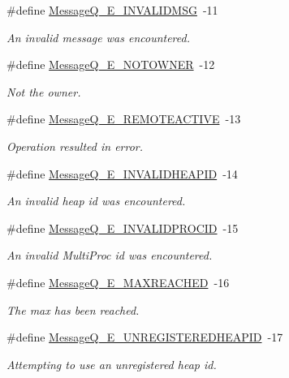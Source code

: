 \begin{DoxyCompactItemize}
\#define \hyperlink{_message_q_8h_abb81e5b9fa7bd062de50e485cd812455}{Message\-Q\-\_\-\-E\-\_\-\-I\-N\-V\-A\-L\-I\-D\-M\-S\-G}~-\/11
\begin{DoxyCompactList}\small\item\em An invalid message was encountered. \end{DoxyCompactList}\item 
\#define \hyperlink{_message_q_8h_af8e0e7cec06ca6f23694547f0c3737e0}{Message\-Q\-\_\-\-E\-\_\-\-N\-O\-T\-O\-W\-N\-E\-R}~-\/12
\begin{DoxyCompactList}\small\item\em Not the owner. \end{DoxyCompactList}\item 
\#define \hyperlink{_message_q_8h_a13e31752ee00b731e2cb9a49d101409b}{Message\-Q\-\_\-\-E\-\_\-\-R\-E\-M\-O\-T\-E\-A\-C\-T\-I\-V\-E}~-\/13
\begin{DoxyCompactList}\small\item\em Operation resulted in error. \end{DoxyCompactList}\item 
\#define \hyperlink{_message_q_8h_a1d39a4db7701897b3160afdba7ba8827}{Message\-Q\-\_\-\-E\-\_\-\-I\-N\-V\-A\-L\-I\-D\-H\-E\-A\-P\-I\-D}~-\/14
\begin{DoxyCompactList}\small\item\em An invalid heap id was encountered. \end{DoxyCompactList}\item 
\#define \hyperlink{_message_q_8h_a00768dde3394e2ec03ee7b7b077fdac5}{Message\-Q\-\_\-\-E\-\_\-\-I\-N\-V\-A\-L\-I\-D\-P\-R\-O\-C\-I\-D}~-\/15
\begin{DoxyCompactList}\small\item\em An invalid Multi\-Proc id was encountered. \end{DoxyCompactList}\item 
\#define \hyperlink{_message_q_8h_aaa9c3ea12ca80e1d3ee4d0d2e30df7aa}{Message\-Q\-\_\-\-E\-\_\-\-M\-A\-X\-R\-E\-A\-C\-H\-E\-D}~-\/16
\begin{DoxyCompactList}\small\item\em The max has been reached. \end{DoxyCompactList}\item 
\#define \hyperlink{_message_q_8h_a62a3fe6b3b29f33cb5b148ca7c0e4a17}{Message\-Q\-\_\-\-E\-\_\-\-U\-N\-R\-E\-G\-I\-S\-T\-E\-R\-E\-D\-H\-E\-A\-P\-I\-D}~-\/17
\begin{DoxyCompactList}\small\item\em Attempting to use an unregistered heap id. \end{DoxyCompactList}\item 

\end{DoxyCompactItemize}
